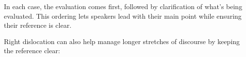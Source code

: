 In each case, the evaluation comes first, followed by clarification of what's being evaluated. This ordering lets speakers lead with their main point while ensuring their reference is clear.

Right dislocation can also help manage longer stretches of discourse by keeping the reference clear:

\ea\label{ex:right-dis-discourse}
   \z
\z
{}

